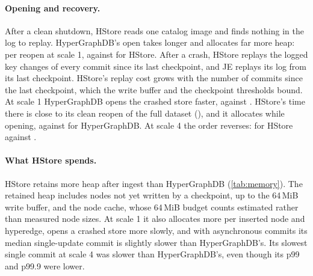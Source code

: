 \paragraph{Opening and recovery.} After a clean shutdown, HStore reads one catalog image and finds nothing in the log to replay. HyperGraphDB's open takes longer and allocates far more heap:  per reopen at scale 1, against  for HStore. After a crash, HStore replays the logged key changes of every commit since its last checkpoint, and JE replays its log from its last checkpoint. HStore's replay cost grows with the number of commits since the last checkpoint, which the write buffer and the checkpoint thresholds bound. At scale 1 HyperGraphDB opens the crashed store faster,  against . HStore's time there is close to its clean reopen of the full dataset (), and it allocates  while opening, against  for HyperGraphDB. At scale 4 the order reverses:  for HStore against .

\paragraph{What HStore spends.} HStore retains more heap after ingest than HyperGraphDB (\cref{tab:memory}). The retained heap includes nodes not yet written by a checkpoint, up to the 64\,MiB write buffer, and the node cache, whose 64\,MiB budget counts estimated rather than measured node sizes. At scale 1 it also allocates more per inserted node and hyperedge, opens a crashed store more slowly, and with asynchronous commits its median single-update commit is slightly slower than HyperGraphDB's. Its slowest single commit at scale 4 was slower than HyperGraphDB's, even though its p99 and p99.9 were lower.
